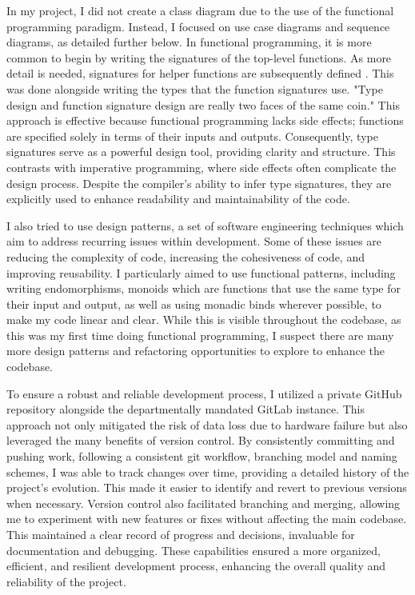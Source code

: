 \documentclass[]{final}
\begin{document}
In my project, I did not create a class diagram due to the use of the functional
programming paradigm. Instead, I focused on use case diagrams and sequence diagrams,
as detailed further below. In functional programming, it is more common to begin
by writing the signatures of the top-level functions. As more detail is needed,
signatures for helper functions are subsequently defined \cite{Wlaschin_functional_2014}.
This was done alongside writing the types that the function signatures use. "Type design and function
signature design are really two faces of the same coin."\cite{noauthor_chapter_2024}
This approach is effective because functional programming lacks side effects; functions are
specified solely in terms of their inputs and outputs. Consequently,
type signatures serve as a powerful design tool, providing clarity and structure.
This contrasts with imperative programming, where side effects often complicate
the design process. Despite the compiler's ability to infer type signatures,
they are explicitly used to enhance readability and maintainability of the code.

I also tried to use design patterns, a set of software engineering
techniques which aim to address recurring issues within development. Some of these
issues are reducing the complexity of code, increasing the cohesiveness of code,
and improving reusability. I particularly aimed to use functional patterns, including
writing endomorphisms, monoids which are functions that use the same type for their
input and output\cite{Wlaschin_functional_2014}, as well as using monadic binds
wherever possible, to make my code linear and clear. While this is visible
throughout the codebase, as this was my first time doing functional programming,
I suspect there are many more design patterns and refactoring opportunities to explore
to enhance the codebase.

To ensure a robust and reliable development process, I utilized a private GitHub repository
alongside the departmentally mandated GitLab instance. This approach not only mitigated
the risk of data loss due to hardware failure but also leveraged the many benefits of
version control. By consistently committing and pushing work, following a consistent
git workflow, branching model and naming schemes, I was able to track changes
over time, providing a detailed history of the project's evolution. This made
it easier to identify and revert to previous versions when necessary. Version
control also facilitated branching and merging, allowing me to experiment with
new features or fixes without affecting the main codebase. This maintained a
clear record of progress and decisions, invaluable for documentation and debugging.
These capabilities ensured a more organized, efficient, and resilient development
process, enhancing the overall quality and reliability of the project.
\end{document}
